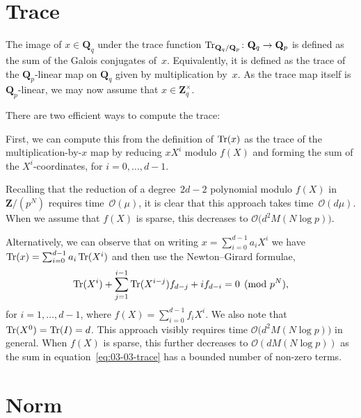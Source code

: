 \section{Trace}

The image of $x \in \mathbf{Q}_q$ under the trace function 
$\operatorname{Tr}_{\mathbf{Q}_q/\mathbf{Q}_p} \colon \mathbf{Q}_q \rightarrow \mathbf{Q}_p$ 
is defined as the sum of the Galois conjugates of~$x$.  Equivalently, 
it is defined as the trace of the $\mathbf{Q}_p$-linear map on 
$\mathbf{Q}_q$ given by multiplication by~$x$.  As the trace map 
itself is $\mathbf{Q}_p$-linear, we may now assume that 
$x \in \mathbf{Z}_q^{\times}$.

There are two efficient ways to compute the trace:

First, we can compute this from the definition of $\operatorname{Tr}(x)$ as the trace 
of the multiplication-by-$x$ map by reducing $x X^i$ modulo $f(X)$ and forming 
the sum of the $X^i$-coordinates, for $i = 0, \dotsc, d - 1$.

Recalling that the reduction of a degree~$2d-2$ polynomial modulo 
$f(X)$ in $\mathbf{Z}/(p^N)$ requires time~$\mathcal{O}(\mu)$, 
it is clear that this approach takes time~$\mathcal{O}(d \mu)$. 
When we assume that $f(X)$ is sparse, this decreases to 
$\mathcal{O}\bigl(d^2 M(N \log p)\bigr)$.

Alternatively, we can observe that on writing $x = \sum_{i=0}^{d-1} a_i X^i$ 
we have $\operatorname{Tr}(x) = \sum_{i=0}^{d-1} a_i \operatorname{Tr}(X^i)$ and then use the 
Newton--Girard formulae,
\begin{equation} \label{eq:03-03-trace}
\operatorname{Tr}(X^i) + \sum_{j=1}^{i-1} \operatorname{Tr}(X^{i-j}) f_{d-j} + i f_{d-i} = 0 \pmod{p^N}, 
\end{equation}
for $i = 1, \dotsc, d-1$, where $f(X) = \sum_{i=0}^{d-1} f_i X^i$.  
We also note that $\operatorname{Tr}(X^0) = \operatorname{Tr}(I) = d$.  This approach visibly 
requires time $\mathcal{O}\bigl(d^2 M(N \log p)\bigr)$ in general.  When 
$f(X)$ is sparse, this further decreases to $\mathcal{O}(d M(N \log p))$ as 
the sum in equation~\eqref{eq:03-03-trace} has a bounded number of 
non-zero terms.

\section{Norm}


